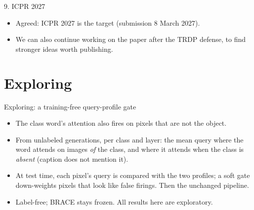 \documentclass[aspectratio=169,11pt]{beamer}
\begin{document}
\begin{frame}{9. ICPR 2027}
\begin{itemize}
\item Agreed: ICPR 2027 is the target (submission 8 March 2027).
\item We can also continue working on the paper after the TRDP defense, to find stronger ideas worth publishing.
\end{itemize}
\end{frame}













\section{Exploring}
\begin{frame}{Exploring: a training-free query-profile gate}
\begin{itemize}
\item The class word's attention also fires on pixels that are not the object.
\item From unlabeled generations, per class and layer: the mean query where the word attends on images \emph{of} the class, and where it attends when the class is \emph{absent} (caption does not mention it).
\item At test time, each pixel's query is compared with the two profiles; a soft gate down-weights pixels that look like false firings. Then the unchanged pipeline.
\item Label-free; BRACE stays frozen. All results here are exploratory.
\end{itemize}
\end{frame}
\end{document}
